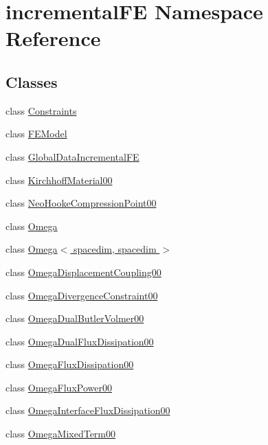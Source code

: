 \hypertarget{namespaceincremental_f_e}{}\section{incremental\+FE Namespace Reference}
\label{namespaceincremental_f_e}
\subsection*{Classes}
\begin{DoxyCompactItemize}
\item 
class \hyperlink{classincremental_f_e_1_1_constraints}{Constraints}
\item 
class \hyperlink{classincremental_f_e_1_1_f_e_model}{F\+E\+Model}
\item 
class \hyperlink{classincremental_f_e_1_1_global_data_incremental_f_e}{Global\+Data\+Incremental\+FE}
\item 
class \hyperlink{classincremental_f_e_1_1_kirchhoff_material00}{Kirchhoff\+Material00}
\item 
class \hyperlink{classincremental_f_e_1_1_neo_hooke_compression_point00}{Neo\+Hooke\+Compression\+Point00}
\item 
class \hyperlink{classincremental_f_e_1_1_omega}{Omega}
\item 
class \hyperlink{classincremental_f_e_1_1_omega_3_01spacedim_00_01spacedim_01_4}{Omega$<$ spacedim, spacedim $>$}
\item 
class \hyperlink{classincremental_f_e_1_1_omega_displacement_coupling00}{Omega\+Displacement\+Coupling00}
\item 
class \hyperlink{classincremental_f_e_1_1_omega_divergence_constraint00}{Omega\+Divergence\+Constraint00}
\item 
class \hyperlink{classincremental_f_e_1_1_omega_dual_butler_volmer00}{Omega\+Dual\+Butler\+Volmer00}
\item 
class \hyperlink{classincremental_f_e_1_1_omega_dual_flux_dissipation00}{Omega\+Dual\+Flux\+Dissipation00}
\item 
class \hyperlink{classincremental_f_e_1_1_omega_flux_dissipation00}{Omega\+Flux\+Dissipation00}
\item 
class \hyperlink{classincremental_f_e_1_1_omega_flux_power00}{Omega\+Flux\+Power00}
\item 
class \hyperlink{classincremental_f_e_1_1_omega_interface_flux_dissipation00}{Omega\+Interface\+Flux\+Dissipation00}
\item 
class \hyperlink{classincremental_f_e_1_1_omega_mixed_term00}{Omega\+Mixed\+Term00}

\end{DoxyCompactItemize}
